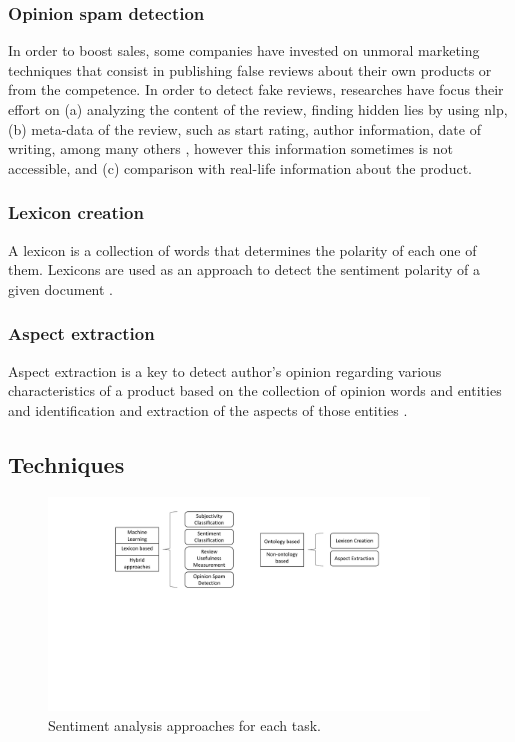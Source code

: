 \subsubsection{Opinion spam detection}
\label{subsubsection:opinion_spam_detection}

In order to boost sales, some companies have invested on unmoral marketing techniques that consist in publishing false reviews about their own products or from the competence. In order to detect fake reviews, researches have focus their effort on (a) analyzing the content of the review, finding hidden lies by using \acrshort{nlp}, (b) meta-data of the review, such as start rating, author information, date of writing, among many others \cite{hu2011fraud}, however this information sometimes is not accessible, and (c) comparison with real-life information about the product. 

\subsubsection{Lexicon creation}
\label{subsubsection:lexicon_creation}

A lexicon is a collection of words that determines the polarity of each one of them. Lexicons are used as an approach to detect the sentiment polarity of a given document \cite{kaji2007building}.

\subsubsection{Aspect extraction}
\label{subsubsection:aspect_extraction}

Aspect extraction is a key to detect author's opinion regarding various characteristics of a product based on the collection of opinion words and entities and identification and extraction of the aspects of those entities \cite{mukherjee2012aspect}.

\subsection{Techniques}
\label{subsec:sentiment_analysis_techniques}

\begin{figure}[!htp]
  \center
  \includegraphics[width=0.9\textwidth]{figures/sentiment_analysis_approaches}
  \caption{Sentiment analysis approaches for each task.}
  \label{fig:sentiment_analysis_approaches}
\end{figure}

